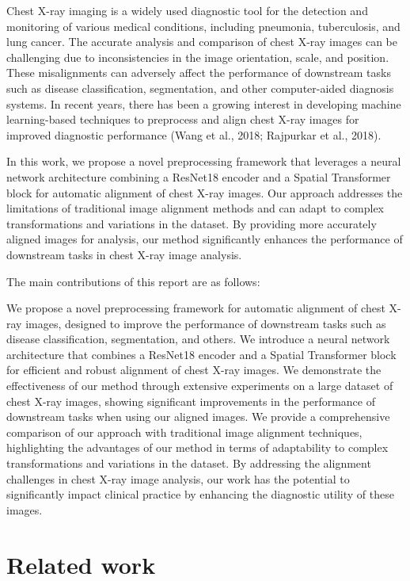 \documentclass{article}
\begin{document}
Chest X-ray imaging is a widely used diagnostic tool for the detection and monitoring of various medical conditions, including pneumonia, tuberculosis, and lung cancer. The accurate analysis and comparison of chest X-ray images can be challenging due to inconsistencies in the image orientation, scale, and position. These misalignments can adversely affect the performance of downstream tasks such as disease classification, segmentation, and other computer-aided diagnosis systems. In recent years, there has been a growing interest in developing machine learning-based techniques to preprocess and align chest X-ray images for improved diagnostic performance (Wang et al., 2018; Rajpurkar et al., 2018).

In this work, we propose a novel preprocessing framework that leverages a neural network architecture combining a ResNet18 encoder and a Spatial Transformer block for automatic alignment of chest X-ray images. Our approach addresses the limitations of traditional image alignment methods and can adapt to complex transformations and variations in the dataset. By providing more accurately aligned images for analysis, our method significantly enhances the performance of downstream tasks in chest X-ray image analysis.

The main contributions of this report are as follows:

We propose a novel preprocessing framework for automatic alignment of chest X-ray images, designed to improve the performance of downstream tasks such as disease classification, segmentation, and others.
We introduce a neural network architecture that combines a ResNet18 encoder and a Spatial Transformer block for efficient and robust alignment of chest X-ray images.
We demonstrate the effectiveness of our method through extensive experiments on a large dataset of chest X-ray images, showing significant improvements in the performance of downstream tasks when using our aligned images.
We provide a comprehensive comparison of our approach with traditional image alignment techniques, highlighting the advantages of our method in terms of adaptability to complex transformations and variations in the dataset.
By addressing the alignment challenges in chest X-ray image analysis, our work has the potential to significantly impact clinical practice by enhancing the diagnostic utility of these images.

\section{Related work}\label{related_work}
\end{document}
